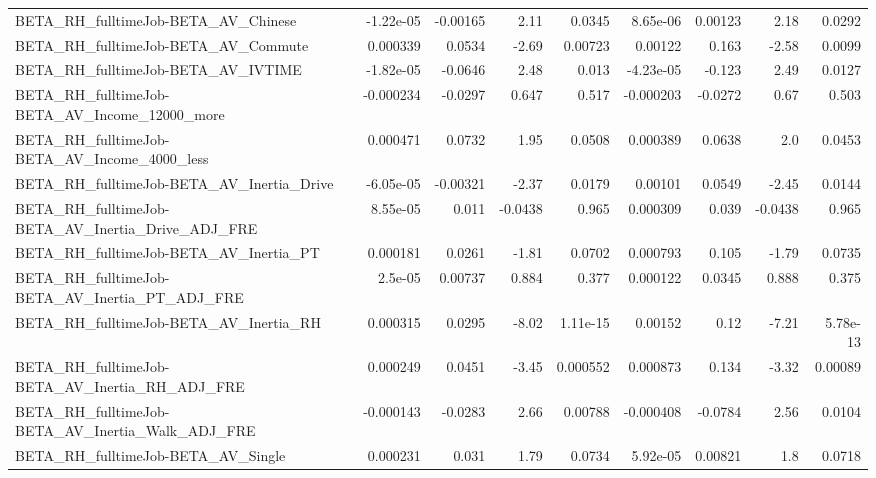 \begin{tabular}{lrrrrrrrr}
BETA\_RH\_fulltimeJob-BETA\_AV\_Chinese                &   -1.22e-05 &     -0.00165 &     2.11 &   0.0345 &   8.65e-06 &     0.00123 &         2.18 &        0.0292 \\
BETA\_RH\_fulltimeJob-BETA\_AV\_Commute                &    0.000339 &       0.0534 &    -2.69 &  0.00723 &    0.00122 &       0.163 &        -2.58 &        0.0099 \\
BETA\_RH\_fulltimeJob-BETA\_AV\_IVTIME                 &   -1.82e-05 &      -0.0646 &     2.48 &    0.013 &  -4.23e-05 &      -0.123 &         2.49 &        0.0127 \\
BETA\_RH\_fulltimeJob-BETA\_AV\_Income\_12000\_more      &   -0.000234 &      -0.0297 &    0.647 &    0.517 &  -0.000203 &     -0.0272 &         0.67 &         0.503 \\
BETA\_RH\_fulltimeJob-BETA\_AV\_Income\_4000\_less       &    0.000471 &       0.0732 &     1.95 &   0.0508 &   0.000389 &      0.0638 &          2.0 &        0.0453 \\
BETA\_RH\_fulltimeJob-BETA\_AV\_Inertia\_Drive          &   -6.05e-05 &     -0.00321 &    -2.37 &   0.0179 &    0.00101 &      0.0549 &        -2.45 &        0.0144 \\
BETA\_RH\_fulltimeJob-BETA\_AV\_Inertia\_Drive\_ADJ\_FRE  &    8.55e-05 &        0.011 &  -0.0438 &    0.965 &   0.000309 &       0.039 &      -0.0438 &         0.965 \\
BETA\_RH\_fulltimeJob-BETA\_AV\_Inertia\_PT             &    0.000181 &       0.0261 &    -1.81 &   0.0702 &   0.000793 &       0.105 &        -1.79 &        0.0735 \\
BETA\_RH\_fulltimeJob-BETA\_AV\_Inertia\_PT\_ADJ\_FRE     &     2.5e-05 &      0.00737 &    0.884 &    0.377 &   0.000122 &      0.0345 &        0.888 &         0.375 \\
BETA\_RH\_fulltimeJob-BETA\_AV\_Inertia\_RH             &    0.000315 &       0.0295 &    -8.02 & 1.11e-15 &    0.00152 &        0.12 &        -7.21 &      5.78e-13 \\
BETA\_RH\_fulltimeJob-BETA\_AV\_Inertia\_RH\_ADJ\_FRE     &    0.000249 &       0.0451 &    -3.45 & 0.000552 &   0.000873 &       0.134 &        -3.32 &       0.00089 \\
BETA\_RH\_fulltimeJob-BETA\_AV\_Inertia\_Walk\_ADJ\_FRE   &   -0.000143 &      -0.0283 &     2.66 &  0.00788 &  -0.000408 &     -0.0784 &         2.56 &        0.0104 \\
BETA\_RH\_fulltimeJob-BETA\_AV\_Single                 &    0.000231 &        0.031 &     1.79 &   0.0734 &   5.92e-05 &     0.00821 &          1.8 &        0.0718 \\

\end{tabular}
